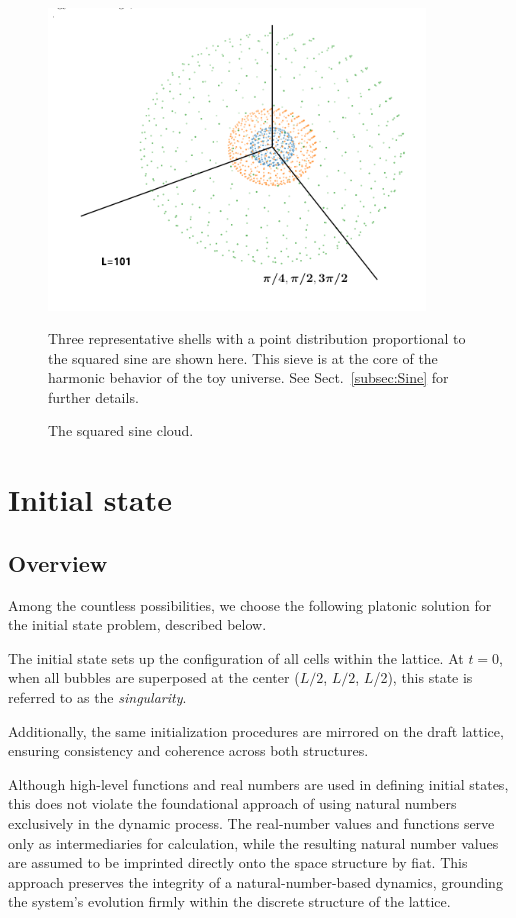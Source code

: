 \documentclass[12pt]{article}
\begin{document}
\begin{figure}
\centering
\includegraphics[width=10cm]{fig2}
\caption{The squared sine cloud.}
\footnotesize{Three representative shells with a point distribution proportional to the squared sine are shown here. This sieve is at the core of the harmonic behavior of the toy universe. See Sect.~\ref{subsec:Sine} for further details.}
\label{fig2}
\end{figure}


\section{Initial state}\label{initial-state}

\subsection{Overview}
Among the countless possibilities, we choose the following platonic solution for the initial state problem, described below.

The initial state sets up the configuration of all cells within the lattice. At $t=0$, when all bubbles are superposed at the center ($L/2$, $L/2$, $L$/2), this state is referred to as the \textit{singularity}.

Additionally, the same initialization procedures are mirrored on the draft lattice, ensuring consistency and coherence across both structures.

Although high-level functions and real numbers are used in defining initial states, this does not violate the foundational approach of using natural numbers exclusively in the dynamic process. The real-number values and functions serve only as intermediaries for calculation, while the resulting natural number values are assumed to be imprinted directly onto the space structure by fiat. This approach preserves the integrity of a natural-number-based dynamics, grounding the system’s evolution firmly within the discrete structure of the lattice.
\end{document}
